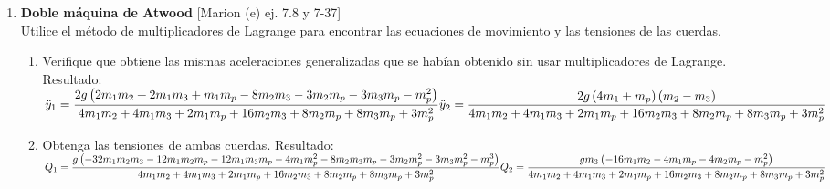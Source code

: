 \documentclass[11pt, spanish, a4paper, twoside]{article}
\begin{document}
\begin{enumerate}
	
	\item
	\begin{minipage}[t][7.5cm]{0.67\textwidth}
	\textbf{Doble máquina de Atwood} [Marion (e) ej. 7.8 y 7-37]\\
	Utilice el método de multiplicadores de Lagrange para encontrar las ecuaciones de movimiento y las tensiones de las cuerdas.
	\begin{enumerate}
		\item Verifique que obtiene las mismas aceleraciones generalizadas que se habían obtenido sin usar multiplicadores de Lagrange.
		Resultado:\\[5 pt]
		\(
			\ddot{y}_{1} = 
			\dfrac{2 g \left(2 m_{1} m_{2} + 2 m_{1} m_{3} + m_{1} m_{p} - 8 m_{2} m_{3} - 3 m_{2} m_{p} - 3 m_{3} m_{p} - m_{p}^{2}\right)}{4 m_{1} m_{2} + 4 m_{1} m_{3} + 2 m_{1} m_{p} + 16 m_{2} m_{3} + 8 m_{2} m_{p} + 8 m_{3} m_{p} + 3 m_{p}^{2}}\\[5 pt]
			\ddot{y}_{2} = 
			\dfrac{2 g \left(4 m_{1} + m_{p}\right) \left(m_{2} - m_{3}\right)}{4 m_{1} m_{2} + 4 m_{1} m_{3} + 2 m_{1} m_{p} + 16 m_{2} m_{3} + 8 m_{2} m_{p} + 8 m_{3} m_{p} + 3 m_{p}^{2}}
		\)
		\item Obtenga las tensiones de ambas cuerdas.
			Resultado:\\[5 pt]
			\(
				Q_{1} = \dfrac{g \left(- 32 m_{1} m_{2} m_{3} - 12 m_{1} m_{2} m_{p} - 12 m_{1} m_{3} m_{p} - 4 m_{1} m_{p}^{2} - 8 m_{2} m_{3} m_{p} - 3 m_{2} m_{p}^{2} - 3 m_{3} m_{p}^{2} - m_{p}^{3}\right)}{4 m_{1} m_{2} + 4 m_{1} m_{3} + 2 m_{1} m_{p} + 16 m_{2} m_{3} + 8 m_{2} m_{p} + 8 m_{3} m_{p} + 3 m_{p}^{2}}
				\\[5 pt]
				Q_{2} = \dfrac{g m_{3} \left(- 16 m_{1} m_{2} - 4 m_{1} m_{p} - 4 m_{2} m_{p} - m_{p}^{2}\right)}{4 m_{1} m_{2} + 4 m_{1} m_{3} + 2 m_{1} m_{p} + 16 m_{2} m_{3} + 8 m_{2} m_{p} + 8 m_{3} m_{p} + 3 m_{p}^{2}}
			\)
		\end{enumerate}
	\end{minipage}
	\begin{minipage}[c][2.5cm][t]{0.3\textwidth}
		
	\end{minipage}


\end{enumerate}
\end{document}
